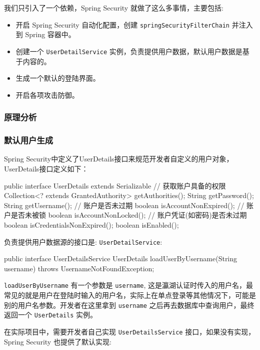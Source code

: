 我们只引入了一个依赖，Spring Security 就做了这么多事情，主要包括:

\begin{itemize}
  \item 开启 Spring Security 自动化配置，创建 \texttt{springSecurityFilterChain} 并注入到 Spring 容器中。
  \item 创建一个 \texttt{UserDetailService} 实例，负责提供用户数据，默认用户数据是基于内容的。
  \item 生成一个默认的登陆界面。
  \item 开启各项攻击防御。
\end{itemize}

\subsubsection{原理分析}

\subsubsection*{默认用户生成}

Spring Security中定义了UserDetails接口来规范开发者自定义的用户对象，UserDetails接口定义如下：

\begin{Java}
public interface UserDetails extends Serializable {
    // 获取账户具备的权限
    Collection<? extends GrantedAuthority> getAuthorities();
    String getPassword();
    String getUsername();
    // 账户是否未过期
    boolean isAccountNonExpired();
    // 账户是否未被锁
    boolean isAccountNonLocked();
    // 账户凭证(如密码)是否未过期
    boolean isCredentialsNonExpired();
    boolean isEnabled();
}
\end{Java}

负责提供用户数据源的接口是: \texttt{UserDetailService}:

\begin{Java}
public interface UserDetailsService {
    UserDetails loadUserByUsername(String username) throws UsernameNotFoundException;
}
\end{Java}

\texttt{loadUserByUsername} 有一个参数是 \texttt{username}, 这是瀛湖认证时传入的用户名，最常见的就是用户在登陆时输入的用户名，实际上在单点登录等其他情况下，可能是别的用户名参数。开发者在这里拿到 \texttt{username} 之后再去数据库中查询用户，最终返回一个 \texttt{UserDetails} 实例。

在实际项目中，需要开发者自己实现 \texttt{UserDetailsService} 接口，如果没有实现，Spring Security 也提供了默认实现:

